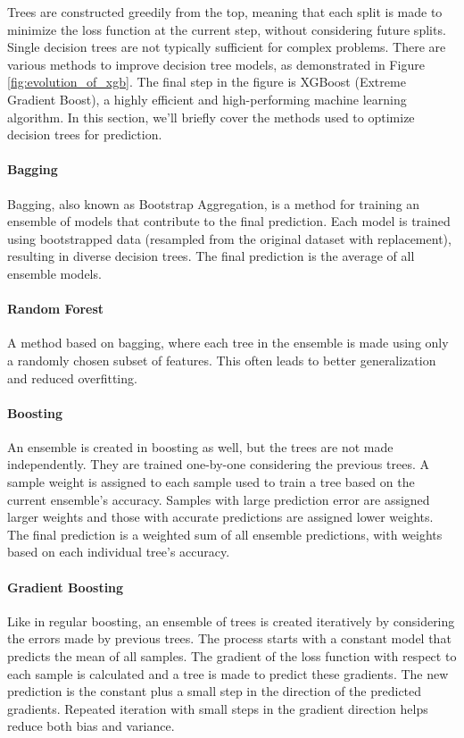 Trees are constructed greedily from the top, meaning that each split is made to minimize the loss function at the current step, without considering future splits.
Single decision trees are not typically sufficient for complex problems.
There are various methods to improve decision tree models, as demonstrated in Figure \ref{fig:evolution_of_xgb}.
The final step in the figure is XGBoost (Extreme Gradient Boost), a highly efficient and high-performing machine learning algorithm.
In this section, we'll briefly cover the methods used to optimize decision trees for prediction.
\cite{Mehta_2019}


\paragraph{Bagging}
Bagging, also known as Bootstrap Aggregation, is a method for training an ensemble of models that contribute to the final prediction.
Each model is trained using bootstrapped data (resampled from the original dataset with replacement), resulting in diverse decision trees.
The final prediction is the average of all ensemble models.

\paragraph{Random Forest}
A method based on bagging, where each tree in the ensemble is made using only a randomly chosen subset of features.
This often leads to better generalization and reduced overfitting.

\paragraph{Boosting}
An ensemble is created in boosting as well, but the trees are not made independently.
They are trained one-by-one considering the previous trees.
A sample weight is assigned to each sample used to train a tree based on the current ensemble's accuracy.
Samples with large prediction error are assigned larger weights and those with accurate predictions are assigned lower weights.
The final prediction is a weighted sum of all ensemble predictions, with weights based on each individual tree's accuracy.

\paragraph{Gradient Boosting}
Like in regular boosting, an ensemble of trees is created iteratively by considering the errors made by previous trees.
The process starts with a constant model that predicts the mean of all samples.
The gradient of the loss function with respect to each sample is calculated and a tree is made to predict these gradients.
The new prediction is the constant plus a small step in the direction of the predicted gradients.
Repeated iteration with small steps in the gradient direction helps reduce both bias and variance.




